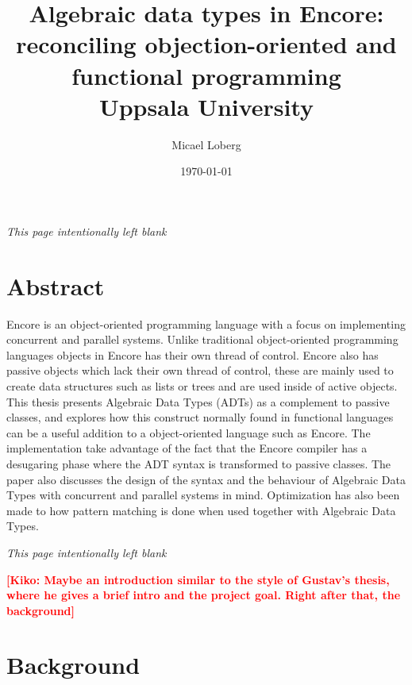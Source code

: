 \documentclass[10pt]{report}
\title{
    {Algebraic data types in Encore:}\\
    {reconciling objection-oriented and functional programming}\\
    {Uppsala University}
}
\author{Micael Loberg}
\date{\today}
\newcommand{\KIKO}[1]{\textcolor{red}{\textbf{[Kiko: #1]}}}
\begin{document}

\maketitle

\newpage\newpage
{\centering \textit{This page intentionally left blank}\par}
\vspace{\fill}


\chapter*{Abstract}
\par{Encore is an object-oriented programming language with a focus on implementing concurrent and parallel systems. Unlike traditional object-oriented programming languages objects in Encore has their own thread of control. Encore also has passive objects which lack their own thread of control, these are mainly used to create data structures such as lists or trees and are used inside of active objects. This thesis presents Algebraic Data Types (ADTs) as a complement to passive classes, and explores how this construct normally found in functional languages can be a useful addition to a object-oriented language such as Encore. The implementation take advantage of the fact that the Encore compiler has a desugaring phase where the ADT syntax is transformed to passive classes. The paper also discusses the design of the syntax and the behaviour of Algebraic Data Types with concurrent and parallel systems in mind. Optimization has also been made to how pattern matching is done when used together with Algebraic Data Types.}

\newpage\newpage
{\centering \textit{This page intentionally left blank}\par}
\vspace{\fill}


\tableofcontents

\KIKO{Maybe an introduction similar to the style of Gustav's thesis, where
he gives a brief intro and the project goal. Right after that, the background}

%
\chapter{Background}
%
\setcounter{page}{1}
\end{document}
